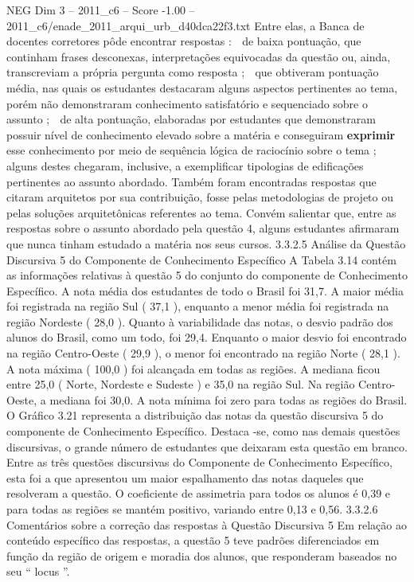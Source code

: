 \begin{textsample}{NEG Dim 3 – 2011\_c6 – Score -1.00 – 2011\_c6/enade\_2011\_arqui\_urb\_d40dca22f3.txt}
Entre elas, a Banca de docentes corretores pôde encontrar respostas :  de baixa pontuação, que continham frases desconexas, interpretações equivocadas da questão ou, ainda, transcreviam a própria pergunta como resposta ;  que obtiveram pontuação média, nas quais os estudantes destacaram alguns aspectos pertinentes ao tema, porém não demonstraram conhecimento satisfatório e sequenciado sobre o assunto ;  de alta pontuação, elaboradas por estudantes que demonstraram possuir nível de conhecimento elevado sobre a matéria e conseguiram \textbf{exprimir} esse conhecimento por meio de sequência lógica de raciocínio sobre o tema ; alguns destes chegaram, inclusive, a exemplificar tipologias de edificações pertinentes ao assunto abordado.
Também foram encontradas respostas que citaram arquitetos por sua contribuição, fosse pelas metodologias de projeto ou pelas soluções arquitetônicas referentes ao tema.
Convém salientar que, entre as respostas sobre o assunto abordado pela questão 4, alguns estudantes afirmaram que nunca tinham estudado a matéria nos seus cursos. 3.3.2.5 Análise da Questão Discursiva 5 do Componente de Conhecimento Específico A Tabela 3.14 contém as informações relativas à questão 5 do conjunto do componente de Conhecimento Específico.
A nota média dos estudantes de todo o Brasil foi 31,7.
A maior média foi registrada na região Sul ( 37,1 ), enquanto a menor média foi registrada na região Nordeste ( 28,0 ).
Quanto à variabilidade das notas, o desvio padrão dos alunos do Brasil, como um todo, foi 29,4.
Enquanto o maior desvio foi encontrado na região Centro-Oeste ( 29,9 ), o menor foi encontrado na região Norte ( 28,1 ).
A nota máxima ( 100,0 ) foi alcançada em todas as regiões.
A mediana ficou entre 25,0 ( Norte, Nordeste e Sudeste ) e 35,0 na região Sul.
Na região Centro-Oeste, a mediana foi 30,0.
A nota mínima foi zero para todas as regiões do Brasil.
O Gráfico 3.21 representa a distribuição das notas da questão discursiva 5 do componente de Conhecimento Específico.
Destaca -se, como nas demais questões discursivas, o grande número de estudantes que deixaram esta questão em branco.
Entre as três questões discursivas do Componente de Conhecimento Específico, esta foi a que apresentou um maior espalhamento das notas daqueles que resolveram a questão.
O coeficiente de assimetria para todos os alunos é 0,39 e para todas as regiões se mantém positivo, variando entre 0,13 e 0,56. 3.3.2.6 Comentários sobre a correção das respostas à Questão Discursiva 5 Em relação ao conteúdo específico das respostas, a questão 5 teve padrões diferenciados em função da região de origem e moradia dos alunos, que responderam baseados no seu “ locus ”.

\end{textsample}

